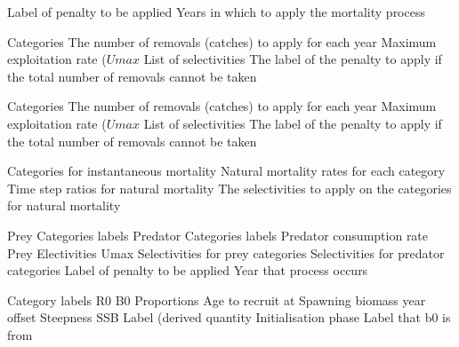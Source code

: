  {Label of penalty to be applied}
 {Years in which to apply the mortality process}
\par\textbf{}\par
{} {Categories}
 {The number of removals (catches) to apply for each year}
 {Maximum exploitation rate ($Umax$}
 {List of selectivities}
 {The label of the penalty to apply if the total number of removals cannot be taken}
\par\textbf{}\par
{} {Categories}
 {The number of removals (catches) to apply for each year}
 {Maximum exploitation rate ($Umax$}
 {List of selectivities}
 {The label of the penalty to apply if the total number of removals cannot be taken}
\par\textbf{}\par
{} {Categories for instantaneous mortality}
 {Natural mortality rates for each category}
 {Time step ratios for natural mortality}
 {The selectivities to apply on the categories for natural mortality}
\par\textbf{}\par
{} {Prey Categories labels}
 {Predator Categories labels}
 {Predator consumption rate}
 {Prey Electivities}
 {Umax}
 {Selectivities for prey categories}
 {Selectivities for predator categories}
 {Label of penalty to be applied}
 {Year that process occurs}
\par\textbf{}\par
{} {Category labels}
 {R0}
 {B0}
 {Proportions}
 {Age to recruit at}
 {Spawning biomass year offset}
 {Steepness}
 {SSB Label (derived quantity}
 {Initialisation phase Label that b0 is from}
